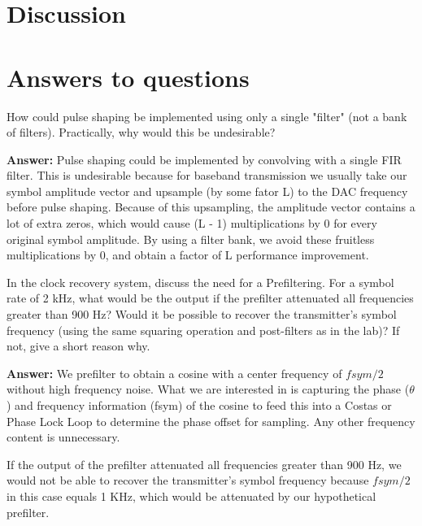 \documentclass{article}
\begin{document}

\section{Discussion}



\section{Answers to questions}

\begin{enumerate}
  \begin{item}
		How could pulse shaping be implemented using only a single "filter" (not a bank of filters). Practically, why would this be undesirable?

  \textbf{Answer:}
		Pulse shaping could be implemented by convolving with a single FIR filter. This is undesirable because for baseband transmission we usually take our symbol amplitude vector and upsample (by some fator L) to the DAC frequency before pulse shaping. Because of this upsampling, the amplitude vector contains a lot of extra zeros, which would cause (L - 1) multiplications by 0 for every original symbol amplitude. By using a filter bank, we avoid these
		fruitless multiplications by 0, and obtain a factor of L performance improvement.
  \end{item}

  \begin{item}
		In the clock recovery system, discuss the need for a Prefiltering. For a symbol rate of 2 kHz, what would be the output if the prefilter attenuated all frequencies greater than 900 Hz? Would it be possible to recover the transmitter's symbol frequency (using the same squaring operation and post-filters as in the lab)? If not, give a short reason why.

  \textbf{Answer:}
		We prefilter to obtain a cosine with a center frequency of $fsym/2$ without high frequency noise. What we are interested in is capturing the phase ($\theta$) and frequency information (fsym) of the cosine to feed this into a Costas or Phase Lock Loop to determine the phase offset for sampling. Any other frequency content is unnecessary.

		If the output of the prefilter attenuated all frequencies greater than 900 Hz, we would not be able to recover the transmitter's symbol frequency because $fsym/2$ in this case equals 1 KHz, which would be attenuated by our hypothetical prefilter.
  \end{item}

\end{enumerate}
\end{document}
